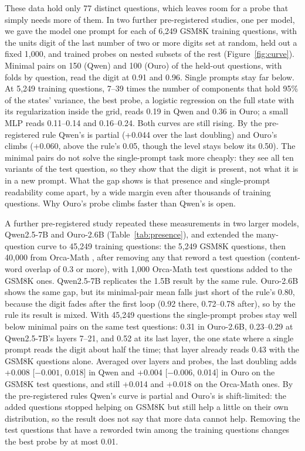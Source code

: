 \documentclass{article}
\begin{document}
These data hold only 77 distinct questions, which leaves room for a probe that simply needs more of them. In two further pre-registered studies, one per model, we gave the model one prompt for each of 6,249 GSM8K training questions, with the units digit of the last number of two or more digits set at random, held out a fixed 1,000, and trained probes on nested subsets of the rest (Figure~\ref{fig:curve}). Minimal pairs on 150 (Qwen) and 100 (Ouro) of the held-out questions, with folds by question, read the digit at 0.91 and 0.96. Single prompts stay far below. At 5,249 training questions, 7--39 times the number of components that hold 95\% of the states' variance, the best probe, a logistic regression on the full state with its regularization inside the grid, reads 0.19 in Qwen and 0.36 in Ouro; a small MLP reads 0.11--0.14 and 0.16--0.24. Both curves are still rising. By the pre-registered rule Qwen's is partial (+0.044 over the last doubling) and Ouro's climbs (+0.060, above the rule's 0.05, though the level stays below its 0.50). The minimal pairs do not solve the single-prompt task more cheaply: they see all ten variants of the test question, so they show that the digit is present, not what it is in a new prompt. What the gap shows is that presence and single-prompt readability come apart, by a wide margin even after thousands of training questions. Why Ouro's probe climbs faster than Qwen's is open.

A further pre-registered study repeated these measurements in two larger models, Qwen2.5-7B and Ouro-2.6B (Table~\ref{tab:presence}), and extended the many-question curve to 45,249 training questions: the 5,249 GSM8K questions, then 40,000 from Orca-Math \citep{mitra2024orcamath}, after removing any that reword a test question (content-word overlap of 0.3 or more), with 1,000 Orca-Math test questions added to the GSM8K ones. Qwen2.5-7B replicates the 1.5B result by the same rule. Ouro-2.6B shows the same gap, but its minimal-pair mean falls just short of the rule's 0.80, because the digit fades after the first loop (0.92 there, 0.72--0.78 after), so by the rule its result is mixed. With 45,249 questions the single-prompt probes stay well below minimal pairs on the same test questions: 0.31 in Ouro-2.6B, 0.23--0.29 at Qwen2.5-7B's layers 7--21, and 0.52 at its last layer, the one state where a single prompt reads the digit about half the time; that layer already reads 0.43 with the GSM8K questions alone. Averaged over layers and probes, the last doubling adds +0.008 [$-0.001$, 0.018] in Qwen and +0.004 [$-0.006$, 0.014] in Ouro on the GSM8K test questions, and still +0.014 and +0.018 on the Orca-Math ones. By the pre-registered rules Qwen's curve is partial and Ouro's is shift-limited: the added questions stopped helping on GSM8K but still help a little on their own distribution, so the result does not say that more data cannot help. Removing the test questions that have a reworded twin among the training questions changes the best probe by at most 0.01.
\end{document}

